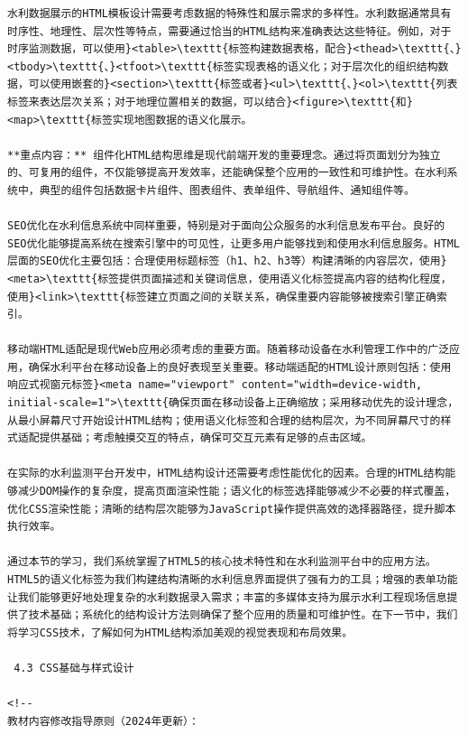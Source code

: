 \begin{lstlisting}
水利数据展示的HTML模板设计需要考虑数据的特殊性和展示需求的多样性。水利数据通常具有时序性、地理性、层次性等特点，需要通过恰当的HTML结构来准确表达这些特征。例如，对于时序监测数据，可以使用}<table>\texttt{标签构建数据表格，配合}<thead>\texttt{、}<tbody>\texttt{、}<tfoot>\texttt{标签实现表格的语义化；对于层次化的组织结构数据，可以使用嵌套的}<section>\texttt{标签或者}<ul>\texttt{、}<ol>\texttt{列表标签来表达层次关系；对于地理位置相关的数据，可以结合}<figure>\texttt{和}<map>\texttt{标签实现地图数据的语义化展示。

**重点内容：** 组件化HTML结构思维是现代前端开发的重要理念。通过将页面划分为独立的、可复用的组件，不仅能够提高开发效率，还能确保整个应用的一致性和可维护性。在水利系统中，典型的组件包括数据卡片组件、图表组件、表单组件、导航组件、通知组件等。

SEO优化在水利信息系统中同样重要，特别是对于面向公众服务的水利信息发布平台。良好的SEO优化能够提高系统在搜索引擎中的可见性，让更多用户能够找到和使用水利信息服务。HTML层面的SEO优化主要包括：合理使用标题标签（h1、h2、h3等）构建清晰的内容层次，使用}<meta>\texttt{标签提供页面描述和关键词信息，使用语义化标签提高内容的结构化程度，使用}<link>\texttt{标签建立页面之间的关联关系，确保重要内容能够被搜索引擎正确索引。

移动端HTML适配是现代Web应用必须考虑的重要方面。随着移动设备在水利管理工作中的广泛应用，确保水利平台在移动设备上的良好表现至关重要。移动端适配的HTML设计原则包括：使用响应式视窗元标签}<meta name="viewport" content="width=device-width, initial-scale=1">\texttt{确保页面在移动设备上正确缩放；采用移动优先的设计理念，从最小屏幕尺寸开始设计HTML结构；使用语义化标签和合理的结构层次，为不同屏幕尺寸的样式适配提供基础；考虑触摸交互的特点，确保可交互元素有足够的点击区域。

在实际的水利监测平台开发中，HTML结构设计还需要考虑性能优化的因素。合理的HTML结构能够减少DOM操作的复杂度，提高页面渲染性能；语义化的标签选择能够减少不必要的样式覆盖，优化CSS渲染性能；清晰的结构层次能够为JavaScript操作提供高效的选择器路径，提升脚本执行效率。

通过本节的学习，我们系统掌握了HTML5的核心技术特性和在水利监测平台中的应用方法。HTML5的语义化标签为我们构建结构清晰的水利信息界面提供了强有力的工具；增强的表单功能让我们能够更好地处理复杂的水利数据录入需求；丰富的多媒体支持为展示水利工程现场信息提供了技术基础；系统化的结构设计方法则确保了整个应用的质量和可维护性。在下一节中，我们将学习CSS技术，了解如何为HTML结构添加美观的视觉表现和布局效果。

 4.3 CSS基础与样式设计

<!--
教材内容修改指导原则（2024年更新）：


\end{lstlisting}
